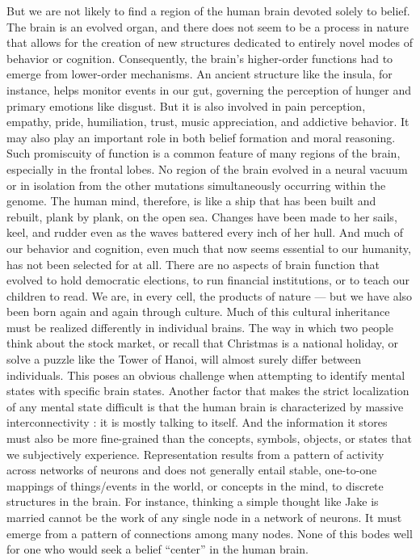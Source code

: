 \documentclass[a4paper,14pt]{extarticle}
\begin{document}
But we are not likely to find a region of the human brain devoted solely to belief.
The brain is an evolved organ, and there does not seem to be a process in nature that allows for the creation of new structures dedicated to entirely novel modes of behavior or cognition.
Consequently, the brain’s higher-order functions had to emerge from lower-order mechanisms.
An ancient structure like the insula, for instance, helps monitor events in our gut, governing the perception of hunger and primary emotions like disgust.
But it is also involved in pain perception, empathy, pride, humiliation, trust, music appreciation, and addictive behavior.
It may also play an important role in both belief formation and moral reasoning.
Such promiscuity of function is a common feature of many regions of the brain, especially in the frontal lobes.
No region of the brain evolved in a neural vacuum or in isolation from the other mutations simultaneously occurring within the genome.
The human mind, therefore, is like a ship that has been built and rebuilt, plank by plank, on the open sea.
Changes have been made to her sails, keel, and rudder even as the waves battered every inch of her hull.
And much of our behavior and cognition, even much that now seems essential to our humanity, has not been selected for at all.
There are no aspects of brain function that evolved to hold democratic elections, to run financial institutions, or to teach our children to read.
We are, in every cell, the products of nature --- but we have also been born again and again through culture.
Much of this cultural inheritance must be realized differently in individual brains.
The way in which two people think about the stock market, or recall that Christmas is a national holiday, or solve a puzzle like the Tower of Hanoi, will almost surely differ between individuals.
This poses an obvious challenge when attempting to identify mental states with specific brain states.
Another factor that makes the strict localization of any mental state difficult is that the human brain is characterized by massive interconnectivity :
it is mostly talking to itself.
And the information it stores must also be more fine-grained than the concepts, symbols, objects, or states that we subjectively experience.
Representation results from a pattern of activity across networks of neurons and does not generally entail stable, one-to-one mappings of things/events in the world, or concepts in the mind, to discrete structures in the brain.
For instance, thinking a simple thought like Jake is married cannot be the work of any single node in a network of neurons.
It must emerge from a pattern of connections among many nodes.
None of this bodes well for one who would seek a belief ``center'' in the human brain.
\end{document}

